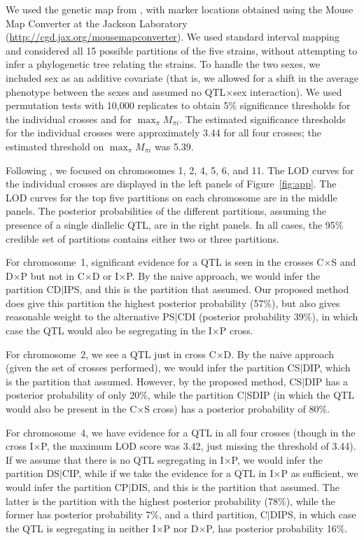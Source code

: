 \documentclass[12pt,letterpaper]{article}
\begin{document}
We used the genetic map from \citet{Cox2009}, with marker locations
obtained using the Mouse Map Converter at the Jackson Laboratory
(\url{http://cgd.jax.org/mousemapconverter}).  We used standard
interval mapping \citep{Lander1989} and considered all 15 possible
partitions of the five strains, without attempting to infer a
phylogenetic tree relating the strains.  To handle the two sexes, we
included sex as an additive covariate (that is, we allowed for a shift
in the average phenotype between the sexes and assumed no
QTL$\times$sex interaction).  We used permutation tests with 10,000
replicates to obtain 5\% significance thresholds for the individual
crosses and for $\max_\pi M_{\pi i}$.  The estimated significance
thresholds for the individual crosses were approximately 3.44 for all
four crosses; the estimated threshold on $\max_\pi M_{\pi i}$ was
5.39.

Following \citet{Li2005}, we focused on chromosomes 1, 2, 4, 5, 6,
and 11.  The LOD curves for the individual crosses are displayed in
the left panels of Figure~\ref{fig:app}.  The LOD curves for the top
five partitions on each chromosome are in the middle panels.  The
posterior probabilities of the different partitions, assuming the
presence of a single diallelic QTL, are in the right panels.
In all cases, the 95\% credible set of partitions contains
either two or three partitions.  

For chromosome~1, significant
evidence for a QTL is seen in the crosses C$\times$S and D$\times$P
but not in C$\times$D or I$\times$P. By the naive approach, we
would infer the partition CD$|$IPS, and this is the partition that
\citet{Li2005} assumed.  Our proposed method does give this
partition the highest posterior probability (57\%), but also gives
reasonable weight to the alternative PS$|$CDI (posterior probability
39\%), in which case the QTL would also be segregating in the
I$\times$P cross. 


For chromosome~2, we see a QTL just in cross C$\times$D.  By the naive
approach (given the set of crosses performed), we would infer the partition CS$|$DIP, which is the partition
that \citet{Li2005} assumed.  However, by the
proposed method, CS$|$DIP has a posterior probability of only
20\%, while the partition C$|$SDIP (in which the QTL would also be
present in the C$\times$S cross) has a posterior probability of 80\%.

For chromosome~4, we have
evidence for a QTL in all four crosses (though in the cross
I$\times$P, the maximum LOD score was 3.42, just missing the threshold of
3.44). If we assume that there is no QTL segregating in I$\times$P, we would infer
the partition DS$|$CIP, while if we take the evidence for a QTL in
I$\times$P as sufficient, we would infer the partition CP$|$DIS, and
this is the partition that \citet{Li2005} assumed.
The latter is the partition with the highest posterior probability
(78\%), while the former has posterior probability 7\%, and a third
partition, C$|$DIPS, in which case the QTL is segregating in neither
I$\times$P nor D$\times$P, has posterior probability 16\%.  
\end{document}
